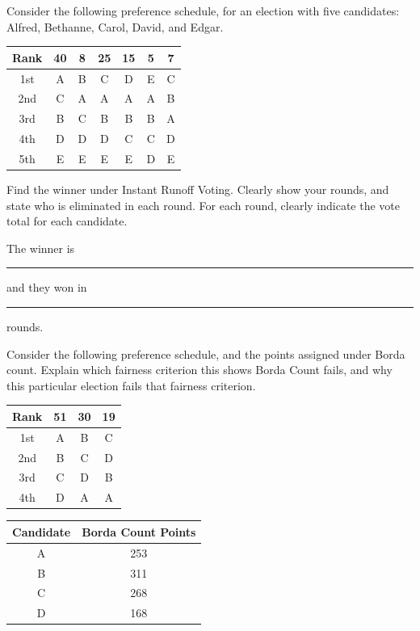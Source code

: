 \documentclass[12pt]{article}
\newcommand{\ans}[1][1in]{\rule{#1}{.5pt}}
\begin{document}
	\item Consider the following preference schedule, for an election with five candidates: Alfred, Bethanne, Carol, David, and Edgar.
	
	\begin{tabular}{c|cccccc}
\textbf{Rank} & \textbf{40} & \textbf{8} & \textbf{25} & \textbf{15} & \textbf{5} & \textbf{7} \\
\hline
1st & A & B & C & D & E & C \\
2nd & C & A & A & A & A & B \\
3rd & B & C & B & B & B & A \\
4th & D & D & D & C & C & D \\
5th & E & E & E & E & D & E \\
\end{tabular}

 Find the winner under Instant Runoff Voting. Clearly show your rounds, and state who is eliminated in each round. For each round, clearly indicate the vote total for each candidate.
	
	

\vfill

The winner is \ans and they won in \ans rounds.

\bigskip

\item Consider the following preference schedule, and the points assigned under Borda count. Explain which fairness criterion this shows Borda Count fails, and why this particular election fails that fairness criterion.

\begin{tabular}{c||c|c|c}
\textbf{Rank} &  \textbf{51} & \textbf{30} & \textbf{19} \\
\hline
1st &  A & B & C \\
2nd &  B & C & D \\
3rd & C & D & B \\
4th & D & A & A \\
\end{tabular}
\hspace{1cm}
\begin{tabular}{c | c}
Candidate & Borda Count Points \\ \hline
A & 253\\
B & 311 \\
C & 268\\
D & 168
\end{tabular}

	\vspace{1in}
	
\end{document}
